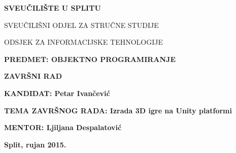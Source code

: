 \begin{center}
\thispagestyle{empty}

\begingroup
    \fontsize{14pt}{12pt}\selectfont\bfseries\center
 	SVEUČILIŠTE U SPLITU \par
	SVEUČILIŠNI ODJEL ZA STRUČNE STUDIJE \par
	ODSJEK ZA INFORMACIJSKE TEHNOLOGIJE
\endgroup\\[4cm]

\end{center}

{ \fontsize{14pt}{12pt}\selectfont\bfseries PREDMET: OBJEKTNO PROGRAMIRANJE}\\[1cm]

\begin{center}
{ \fontsize{16pt}{12pt}\selectfont\bfseries ZAVRŠNI RAD}
\end{center}

{ \fontsize{12pt}{2.5cm}\selectfont\bfseries KANDIDAT: Petar Ivančević}\par
{ \fontsize{12pt}{2.5cm}\selectfont\bfseries TEMA ZAVRŠNOG RADA: Izrada 3D igre na Unity platformi}\par
{ \fontsize{12pt}{2.5cm}\selectfont\bfseries MENTOR: Ljiljana Despalatović}

\begin{center}
\vfill
{ \fontsize{14pt}{12pt}\selectfont\bfseries Split, rujan 2015.}
\end{center}
